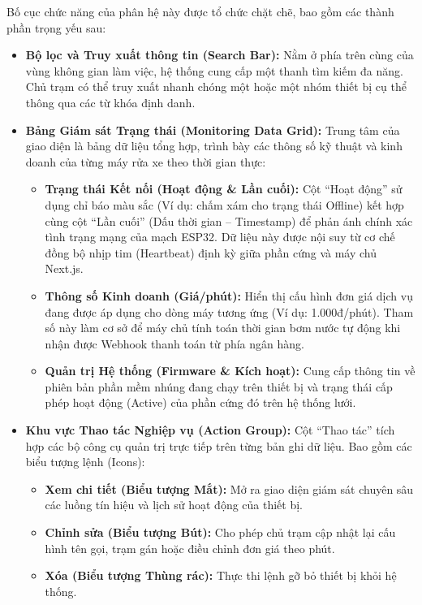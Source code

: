 \documentclass[../main.tex]{subfiles}
\begin{document}
Bố cục chức năng của phân hệ này được tổ chức chặt chẽ, bao gồm các thành phần trọng yếu sau:
\begin{itemize}
    \item \textbf{Bộ lọc và Truy xuất thông tin (Search Bar):} Nằm ở phía trên cùng của vùng không gian làm việc, hệ thống cung cấp một thanh tìm kiếm đa năng. Chủ trạm có thể truy xuất nhanh chóng một hoặc một nhóm thiết bị cụ thể thông qua các từ khóa định danh.
    \item \textbf{Bảng Giám sát Trạng thái (Monitoring Data Grid):} Trung tâm của giao diện là bảng dữ liệu tổng hợp, trình bày các thông số kỹ thuật và kinh doanh của từng máy rửa xe theo thời gian thực:
    \begin{itemize}
        \item \textbf{Trạng thái Kết nối (Hoạt động \& Lần cuối):} Cột ``Hoạt động'' sử dụng chỉ báo màu sắc (Ví dụ: chấm xám cho trạng thái Offline) kết hợp cùng cột ``Lần cuối'' (Dấu thời gian -- Timestamp) để phản ánh chính xác tình trạng mạng của mạch ESP32. Dữ liệu này được nội suy từ cơ chế đồng bộ nhịp tim (Heartbeat) định kỳ giữa phần cứng và máy chủ Next.js.
        \item \textbf{Thông số Kinh doanh (Giá/phút):} Hiển thị cấu hình đơn giá dịch vụ đang được áp dụng cho dòng máy tương ứng (Ví dụ: 1.000đ/phút). Tham số này làm cơ sở để máy chủ tính toán thời gian bơm nước tự động khi nhận được Webhook thanh toán từ phía ngân hàng.
        \item \textbf{Quản trị Hệ thống (Firmware \& Kích hoạt):} Cung cấp thông tin về phiên bản phần mềm nhúng đang chạy trên thiết bị và trạng thái cấp phép hoạt động (Active) của phần cứng đó trên hệ thống lưới.
    \end{itemize}
    \item \textbf{Khu vực Thao tác Nghiệp vụ (Action Group):} Cột ``Thao tác'' tích hợp các bộ công cụ quản trị trực tiếp trên từng bản ghi dữ liệu. Bao gồm các biểu tượng lệnh (Icons):
    \begin{itemize}
        \item \textbf{Xem chi tiết (Biểu tượng Mắt):} Mở ra giao diện giám sát chuyên sâu các luồng tín hiệu và lịch sử hoạt động của thiết bị.
        \item \textbf{Chỉnh sửa (Biểu tượng Bút):} Cho phép chủ trạm cập nhật lại cấu hình tên gọi, trạm gán hoặc điều chỉnh đơn giá theo phút.
        \item \textbf{Xóa (Biểu tượng Thùng rác):} Thực thi lệnh gỡ bỏ thiết bị khỏi hệ thống.
    \end{itemize}
\end{itemize}
\end{document}
